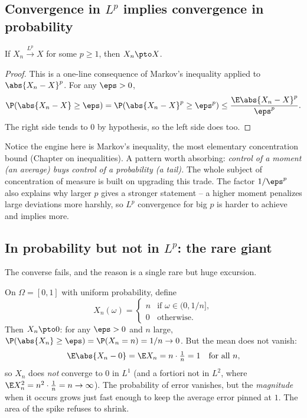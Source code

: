 \subsection{Convergence in $L^p$ implies convergence in probability}
\label{ch22:lp-implies-p}

\begin{theorem}
\label{ch22:thm-lp-p}
If $X_n \xrightarrow{L^p} X$ for some $p\ge1$, then $X_n \pto X$.
\end{theorem}

\begin{proof}
This is a one-line consequence of Markov's inequality applied to $\abs{X_n - X}^p$.
For any $\eps>0$,
\[
  \P(\abs{X_n - X}\ge\eps)
  = \P(\abs{X_n - X}^p \ge \eps^p)
  \le \frac{\E\abs{X_n - X}^p}{\eps^p}.
\]
The right side tends to $0$ by hypothesis, so the left side does too.
\end{proof}

\begin{connectionbox}
Notice the engine here is Markov's inequality, the most elementary concentration bound
(Chapter on inequalities). A pattern worth absorbing: \emph{control of a moment
(an average) buys control of a probability (a tail).} The whole subject of
concentration of measure is built on upgrading this trade. The factor $1/\eps^p$ also
explains why larger $p$ gives a stronger statement -- a higher moment penalizes large
deviations more harshly, so $L^p$ convergence for big $p$ is harder to achieve and
implies more.
\end{connectionbox}

\subsection{In probability but not in $L^p$: the rare giant}
\label{ch22:giant}

The converse fails, and the reason is a single rare but huge excursion.

\begin{example}
\label{ch22:ex-spike}
On $\Omega=[0,1]$ with uniform probability, define
\[
  X_n(\omega) =
  \begin{cases}
    n & \text{if } \omega \in (0, 1/n],\\
    0 & \text{otherwise.}
  \end{cases}
\]
Then $X_n \pto 0$: for any $\eps>0$ and $n$ large, $\P(\abs{X_n}\ge\eps)=\P(X_n=n)=
1/n \to 0$. But the mean does not vanish:
\[
  \E\abs{X_n - 0} = \E X_n = n\cdot\tfrac1n = 1 \quad\text{for all } n,
\]
so $X_n$ does \emph{not} converge to $0$ in $L^1$ (and a fortiori not in $L^2$, where
$\E X_n^2 = n^2\cdot\frac1n = n \to\infty$). The probability of error vanishes, but
the \emph{magnitude} when it occurs grows just fast enough to keep the average error
pinned at $1$. The area of the spike refuses to shrink.
\end{example}

